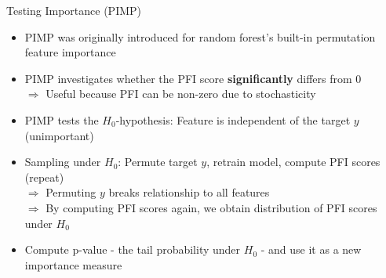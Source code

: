 \documentclass[11pt,compress,t,notes=noshow, aspectratio=169, xcolor=table]{beamer}
\begin{document}
\begin{frame}{Testing Importance (PIMP) }

\begin{itemize}[<+->]
  \item PIMP was originally introduced for random forest's built-in permutation feature importance
  \item PIMP investigates whether the PFI score \textbf{significantly} differs from 0\\
  $\Rightarrow$ Useful because PFI can be non-zero due to stochasticity
  \item PIMP tests the $H_0$-hypothesis: Feature is independent of the target $y$ (unimportant)
  \item Sampling under $H_0$: Permute target $y$, retrain model, compute PFI scores (repeat)\\
  $\Rightarrow$ Permuting $y$ breaks relationship to all features\\
  $\Rightarrow$ By computing PFI scores again, we obtain distribution of PFI scores under $H_0$
  \item %
  Compute p-value - the tail probability under $H_0$ - and use it as a new importance measure
\end{itemize}


\end{frame}
\end{document}
